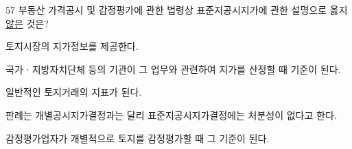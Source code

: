 \begin{question}{57}
부동산 가격공시 및 감정평가에 관한 법령상 표준지공시지가에 관한 설명으로 옳지 \uline{않은} 것은?
\begin{choices}
  \item 토지시장의 지가정보를 제공한다.
  \item 국가ㆍ지방자치단체 등의 기관이 그 업무와 관련하여 지가를 산정할 때 기준이 된다.
  \item 일반적인 토지거래의 지표가 된다.
  \item 판례는 개별공시지가결정과는 달리 표준지공시지가결정에는 처분성이 없다고 한다.
  \item 감정평가업자가 개별적으로 토지를 감정평가할 때 그 기준이 된다.
\end{choices}
\end{question}
